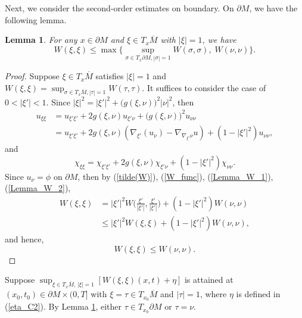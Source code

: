 \documentclass[12pt]{amsart}
\newtheorem{lemma}[theorem]{Lemma}
\theoremstyle{definition}
\theoremstyle{remark}
\numberwithin{equation}{section}
\begin{document}
Next, we consider the second-order estimates on boundary.
On $\partial M$, we have the following lemma.
\begin{lemma}\label{W_bd_lemma}
	For any $x\in \partial M$ and $\xi \in T_x\overline{M}$ with $|\xi| = 1$, we have
	\begin{equation}
	W(\xi, \xi) \leq \max \Big\{ \sup_{\sigma \in T_x \partial M, |\sigma|=1} W(\sigma, \sigma),\; W(\nu, \nu) \Big\}.
	\end{equation}
\end{lemma}
\begin{proof}
	Suppose $\xi \in T_x\overline{M}$ satisfies $|\xi| = 1$ and $W(\xi, \xi) = \sup_{\sigma \in T_x \overline{M}, |\tau|=1} W(\tau, \tau)$. It suffices to consider the case of $0< |\xi'| <1$.
	Since $|\xi|^2 = |\xi'|^2 + \big(g(\xi, \nu)\big)^2 |\nu|^2$, then
	\begin{equation}\label{Lemma_W_1}
	\begin{aligned}
	u_{\xi\xi} &= u_{\xi'\xi'} + 2 g(\xi, \nu) u_{\xi'\nu} + \big(g(\xi, \nu)\big)^2 u_{\nu\nu}\\
	&= u_{\xi'\xi'} + 2 g(\xi, \nu) \left( \nabla_{\xi'}(u_\nu) - \nabla_{\nabla_{\xi'}\nu}u \right) + (1 - |\xi'|^2) u_{\nu\nu}, 
	\end{aligned}
	\end{equation}
	and
	\begin{equation}\label{Lemma_W_2}
	\chi_{\xi\xi} = \chi_{\xi'\xi'} + 2 g(\xi, \nu) \chi_{\xi'\nu} + (1 - |\xi'|^2) \chi_{\nu\nu}.
	\end{equation}
	Since $u_\nu = \phi$ on $\partial M$, then by (\ref{tilde(W)}), (\ref{W_func}), (\ref{Lemma_W_1}), (\ref{Lemma_W_2}),
	\begin{equation}
	\begin{aligned}
	W(\xi, \xi) &= |\xi'|^2 W\Big(\frac{\xi'}{|\xi'|}, \frac{\xi'}{|\xi'|}\Big) + (1 - |\xi'|^2) W(\nu, \nu)\\
	&\leq |\xi'|^2 W(\xi, \xi) + (1 - |\xi'|^2) W(\nu, \nu),
	\end{aligned}
	\end{equation}
	and hence,
	\begin{equation}
	W(\xi, \xi) \leq W(\nu, \nu).
	\end{equation}
\end{proof}

Suppose $\sup_{\xi \in T_x \overline{M},\, |\xi|=1} \left[W(\xi , \xi)(x, t) + \eta\right] $ is attained at $(x_0, t_0) \in \partial M \times (0, T]$ with $\xi = \tau \in T_{x_0} \overline{M}$ and $|\tau| = 1$, where $\eta$ is defined in (\ref{eta_C2}). By Lemma \ref{W_bd_lemma}, either $\tau \in T_{x_0}\partial M$ or $\tau = \nu$. 
\end{document}
